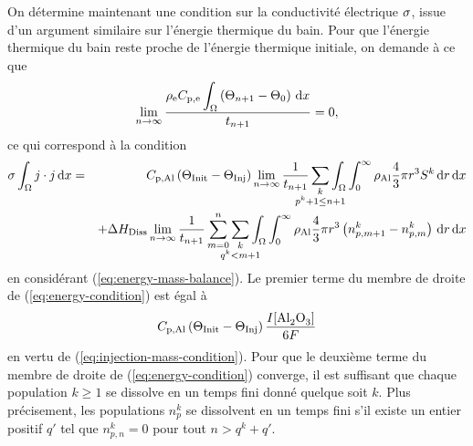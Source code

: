 On détermine maintenant une condition sur la conductivité
électrique $\sigma$, issue d'un argument similaire sur
l'énergie thermique du bain. Pour que l'énergie thermique du bain
reste proche de l'énergie thermique initiale, on demande à ce que
\begin{equation}
  \lim_{n\to\infty}\frac{\rho_\mathrm{e}C_{\mathrm{p,e}}\displaystyle\int_\Omega\left( \Theta_{n+1}
    - \Theta_0 \right)\,\mathrm dx}{t_{n+1}} = 0,
\end{equation}
ce qui correspond à la condition
\begin{eqnarray}
  \conductivity \int_\Omega j\cdot j\intd{x} &=&
  \aluminahc\parent{\tinit - \tinj}\lim_{n\to\infty}\frac{1}{t_{n+1}}\sum_{\mathclap{\substack{k\\ p^k +
  1 \leq n + 1}}}\int_\Omega\int_0^\infty\aluminadensity
  \frac{4}{3}\pi r^3 S^k\intd{r}\intd{x}\nonumber \\
  &&+ {\aluminadissolutionenthalpy}\lim_{n\to\infty}\frac{1}{t_{n+1}}\sum_{m = 0}^{n}\sum_{\mathclap{\substack{k\\ q^k < m + 1}}} \int_\Omega\int_0^\infty \aluminadensity \frac{4}{3}\pi r^3\parent{n_{p,m+1}^k-n_{p,m}^k}\intd{r}\intd{x}\label{eq:energy-condition}
\end{eqnarray}
en considérant (\ref{eq:energy-mass-balance}). Le premier terme du
membre de droite de (\ref{eq:energy-condition}) est égal à
\begin{equation*}
\aluminahc\parent{\tinit-\tinj}  \frac{I[\cee{Al2O3}]}{6F}
\end{equation*}
en vertu de (\ref{eq:injection-mass-condition}). Pour que le deuxième
terme du membre de droite de (\ref{eq:energy-condition}) converge, il
est suffisant que chaque population $k\geq 1$ se dissolve en un temps
fini donné quelque soit $k$. Plus précisement, les populations $n_p^k$
se dissolvent en un temps fini s'il existe un entier positif $q'$ tel
que $n_{p,n}^k = 0$ pour tout $n > q^k + q'$.

